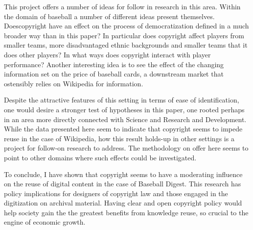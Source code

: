 \documentclass[12pt]{article}
\begin{document}
This project offers a number of ideas for follow in research in this area. Within the domain of baseball a number of different ideas present themselves. Doescopyright have an effect on the process of democratization defined in a much broader way than in this paper? In particular does copyright affect players from smaller teams, more disadvantaged ethnic backgrounds and smaller teams that it does other players? In what ways does copyright interact with player performance? Another interesting idea is to see the effect of the changing information set on the price of baseball cards, a downstream market that ostensibly relies on Wikipedia for information. 

Despite the attractive features of this setting in terms of ease of identification, one would desire a stronger test of hypotheses in this paper, one rooted perhaps in an area more directly connected with Science and Research and Development. While the data presented here seem to indicate that copyright seems to impede reuse in the case of Wikipedia, how this result holds-up in other settings is a project for follow-on research to address. The methodology on offer here seems to point to other domains where such effects could be investigated. 

To conclude, I have shown that copyright seems to have a moderating influence on the reuse of digital content in the case of Baseball Digest. This research has policy implications for designers of copyright law and those engaged in the digitization on archival material. Having clear and open copyright policy would help society gain the the greatest benefits from knowledge reuse, so crucial to the engine of economic growth. 


\baselineskip 14.2pt


\end{document}
